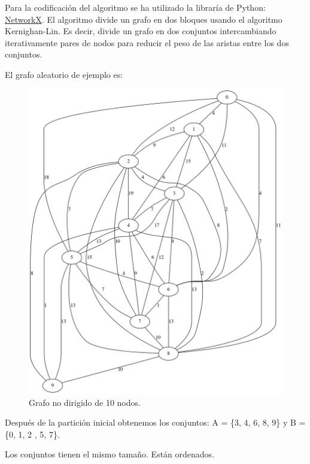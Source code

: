 Para la codificación del algoritmo se ha utilizado la libraría de Python: \href{https://networkx.github.io/documentation/stable/reference/algorithms/generated/networkx.algorithms.community.kernighan_lin.kernighan_lin_bisection.html}{NetworkX}. El algoritmo divide un grafo en dos bloques usando el algoritmo Kernighan-Lin\cite{KernighanLin}. Es decir, divide un grafo en dos conjuntos intercambiando iterativamente pares de nodos para reducir el peso de las aristas entre los dos conjuntos.

El grafo aleatorio de ejemplo es:

\renewcommand{\figurename}{Figura}
\begin{figure}[h]
	\centering
	\includegraphics[scale=0.25]{Figures/10_dataset}
	\vspace{1mm}
	\caption{Grafo no dirigido de 10 nodos.}
	\label{grafo_1}
\end{figure}

Después de la partición inicial obtenemos los conjuntos: A = \{3, 4, 6, 8, 9\} y B = \{0, 1, 2 , 5, 7\}.

Los conjuntos tienen el mismo tamaño. Están ordenados.

